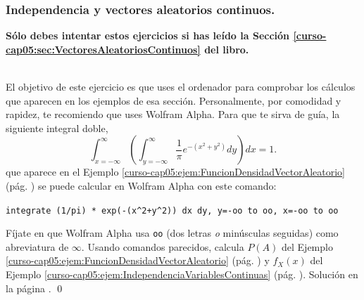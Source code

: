 \documentclass[10pt,a4paper]{article}\usepackage[]{graphicx}\usepackage[]{color}
\newcounter{cont01}
\begin{document}
\subsubsection*{Independencia y vectores aleatorios continuos.}
{\bf Sólo debes intentar estos ejercicios si has leído la Sección \ref{curso-cap05:sec:VectoresAleatoriosContinuos} del libro.}
\begin{ejercicio}
\label{tut05:ejercicio57}
\quad\\
El objetivo de este ejercicio es que uses el ordenador para comprobar los cálculos que aparecen en los ejemplos de esa sección. Personalmente, por comodidad y rapidez, te recomiendo que uses Wolfram Alpha. Para que te sirva de guía, la siguiente integral doble,
\[
\int_{x=-\infty}^{\infty}\left(\int_{y=-\infty}^{\infty}\dfrac{1}{\pi}e^{-(x^2+y^2)}dy\right)dx = 1.
\]
que aparece en el Ejemplo \ref{curso-cap05:ejem:FuncionDensidadVectorAleatorio} (pág. \pageref{curso-cap05:ejem:FuncionDensidadVectorAleatorio}) se puede calcular en Wolfram Alpha con este comando:
\begin{center}
  \verb#integrate (1/pi) * exp(-(x^2+y^2)) dx dy, y=-oo to oo, x=-oo to oo#
\end{center}
Fíjate en que Wolfram Alpha usa {\tt oo} (dos letras {\em o} minúsculas seguidas) como abreviatura de $\infty$.
Usando comandos parecidos, calcula $P(A)$ del Ejemplo \ref{curso-cap05:ejem:FuncionDensidadVectorAleatorio} (pág. \pageref{curso-cap05:ejem:FuncionDensidadVectorAleatorio}) y $f_X(x)$ del Ejemplo \ref{curso-cap05:ejem:IndependenciaVariablesContinuas}  (pág. \pageref{curso-cap05:ejem:IndependenciaVariablesContinuas}). Solución en la página \pageref{tut05:ejercicio57:sol}.
\qed
\end{ejercicio}
\end{document}
